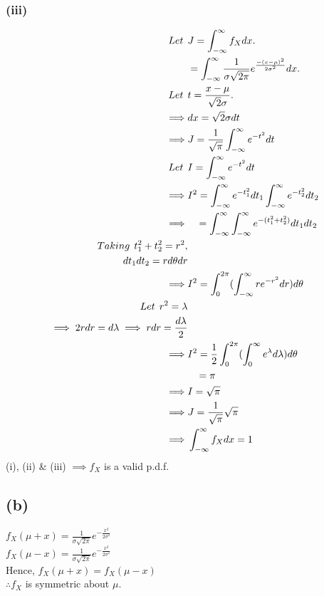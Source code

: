 \documentclass[a4paper,fleqn,11pt]{article}
\theoremstyle{mytheor}
\begin{document}
\subsubsection*{(iii)}
\begin{align*}
Let \hspace{1ex} & J = \int_{-\infty}^{\infty} f_{X} dx. \\
& = \int_{-\infty}^{\infty} \frac{1}{\sigma \sqrt{2\pi}} e^{\frac{-(x - \mu)^2}{2 \sigma^2}} dx. \\
Let \hspace{1ex} & t = \frac{x - \mu}{\sqrt{2} \sigma}. \\
\implies & dx = \sqrt{2} \sigma dt \\
\implies & J = \frac{1}{\sqrt{\pi}}\int_{-\infty}^{\infty} e^{-t^2} dt \\
Let \hspace{1ex} & I = \int_{-\infty}^{\infty} e^{-t^2} dt \\
\implies & I^2 = \int_{-\infty}^{\infty} e^{-t_{1}^2} dt_{1} \int_{-\infty}^{\infty} e^{-t_{2}^2} dt_{2} \\
\implies & \hspace{2ex} = \int_{-\infty}^{\infty}\int_{-\infty}^{\infty} e^{-(t_{1}^2 + t_{2}^2)} dt_{1} dt_{2} \\
Taking \hspace{1ex} t_{1}^2 + t_{2}^2 = r^2, \\
dt_{1}dt_{2} = rd \theta dr \\
\implies & I^2 = \int_{0}^{2\pi}(\int_{-\infty}^{\infty} r e^{-r^2} dr) d \theta \\
Let \hspace{1ex} r^2 = \lambda \\
\implies 2r dr = d\lambda \implies r dr = \frac{d\lambda}{2} \\
\implies & I^2 = \frac{1}{2} \int_{0}^{2\pi}(\int_{0}^{\infty} e^\lambda d\lambda) d \theta \\
& \hspace{2ex} = \pi \\
\implies & I = \sqrt{\pi} \\
\implies & J = \frac{1}{\sqrt{\pi}} \sqrt{\pi} \\
\implies & \int_{-\infty}^{\infty} f_{X} dx = 1
\end{align*}
(i), (ii) \& (iii) $\implies f_{X}$ is a valid p.d.f.
\subsection{(b)}
$f_{X} (\mu + x) = \frac{1}{\sigma \sqrt{2\pi}} e^{-\frac{x^2}{2\sigma^2}}$ \\
$f_{X} (\mu - x) = \frac{1}{\sigma \sqrt{2\pi}} e^{-\frac{x^2}{2\sigma^2}}$ \\
Hence, $f_{X} (\mu + x) = f_{X} (\mu - x)$ \\
$\therefore f_{X}$ is symmetric about $\mu$. \\
\end{document}
